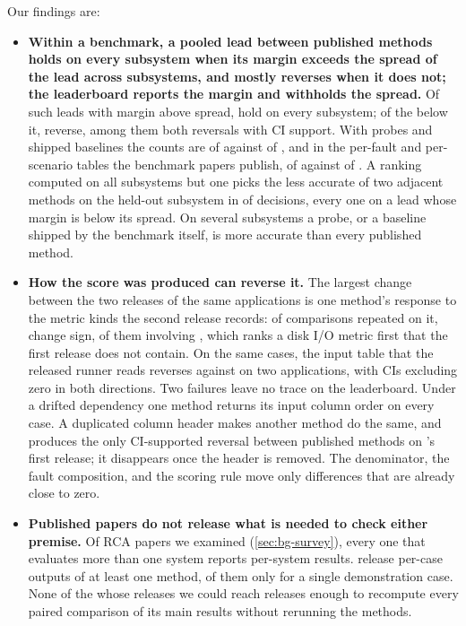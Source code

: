 Our findings are:
\begin{itemize}
\item \textbf{Within a benchmark, a pooled lead between published methods holds on every subsystem when its margin exceeds the spread of the lead across subsystems, and mostly reverses when it does not; the leaderboard reports the margin and withholds the spread.} Of \NPubAbove such leads with margin above spread, \NPubAboveHold hold on every subsystem; of the \NPubBelow below it, \NPubBelowRev reverse, among them both reversals with CI support. With probes and shipped baselines the counts are \NAllBelowRev of \NAllBelow against \NAllAboveRev of \NAllAbove, and in the per-fault and per-scenario tables the benchmark papers publish, \NTabBelowRev of \NTabBelow against \NTabAboveRev of \NTabAbove. A ranking computed on all subsystems but one picks the less accurate of two adjacent methods on the held-out subsystem in \HErr of \HNDec decisions, every one on a lead whose margin is below its spread. On several subsystems a probe, or a baseline shipped by the benchmark itself, is more accurate than every published method.
\item \textbf{How the score was produced can reverse it.} The largest change between the two releases of the same applications is one method's response to the metric kinds the second release records: of \NCrossPub comparisons repeated on it, \NCrossPubChange change sign, \NCrossPubChangeBaro of them involving \baro, which ranks a disk I/O metric first that the first release does not contain. On the same cases, the input table that the released runner reads reverses \circa against \rcd on two applications, with CIs excluding zero in both directions. Two failures leave no trace on the leaderboard. Under a drifted dependency one method returns its input column order on every case. A duplicated column header makes another method do the same, and produces the only CI-supported reversal between published methods on \rcaeval's first release; it disappears once the header is removed. The denominator, the fault composition, and the scoring rule move only differences that are already close to zero.
\item \textbf{Published papers do not release what is needed to check either premise.} Of \SurveyN RCA papers we examined (\cref{sec:bg-survey}), every one that evaluates more than one system reports per-system results. \SurveyRelAny release per-case outputs of at least one method, \SurveyRelDemo of them only for a single demonstration case. None of the \SurveyRelFullCheckable whose releases we could reach releases enough to recompute every paired comparison of its main results without rerunning the methods.
\end{itemize}


